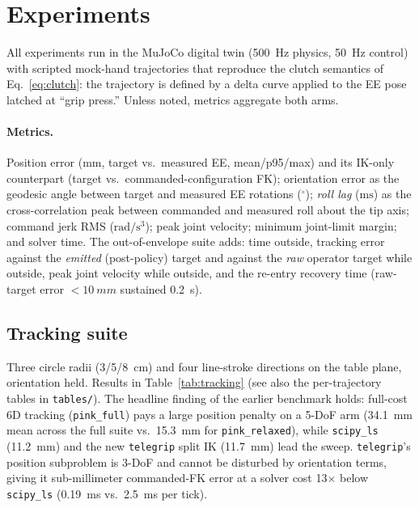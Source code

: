 \section{Experiments}
\label{sec:experiments}

All experiments run in the MuJoCo digital twin (\SI{500}{Hz} physics,
\SI{50}{Hz} control) with scripted mock-hand trajectories that reproduce the
clutch semantics of Eq.~\eqref{eq:clutch}: the trajectory is defined by a
delta curve applied to the EE pose latched at ``grip press.'' Unless noted,
metrics aggregate both arms.

\paragraph{Metrics.}
Position error (\(\mathrm{mm}\), target vs.\ measured EE, mean/p95/max) and
its IK-only counterpart (target vs.\ commanded-configuration FK);
orientation error as the geodesic angle between target and measured EE
rotations (\(^\circ\)); \emph{roll lag} (\(\mathrm{ms}\)) as the
cross-correlation peak between commanded and measured roll about the tip
axis; command jerk RMS (\(\mathrm{rad/s^3}\)); peak joint velocity; minimum
joint-limit margin; and solver time. The out-of-envelope suite adds:
time outside, tracking error against the \emph{emitted} (post-policy)
target and against the \emph{raw} operator target while outside, peak joint
velocity while outside, and the re-entry recovery time (raw-target error
\(<\SI{10}{mm}\) sustained \SI{0.2}{s}).

\subsection{Tracking suite}
\label{sec:exp-tracking}

Three circle radii (3/5/\SI{8}{cm}) and four line-stroke directions on the
table plane, orientation held. Results in
Table~\ref{tab:tracking} (see also the per-trajectory tables in
\texttt{tables/}). The headline finding of the earlier benchmark holds:
full-cost 6D tracking (\texttt{pink\_full}) pays a large position penalty
on a 5-DoF arm (\SI{34.1}{mm} mean across the full suite vs.\
\SI{15.3}{mm} for \texttt{pink\_relaxed}), while \texttt{scipy\_ls}
(\SI{11.2}{mm}) and the new \texttt{telegrip} split IK (\SI{11.7}{mm})
lead the sweep. \texttt{telegrip}'s position subproblem is 3-DoF and
cannot be disturbed by orientation terms, giving it sub-millimeter
commanded-FK error at a solver cost 13\(\times\) below
\texttt{scipy\_ls} (\SI{0.19}{ms} vs.\ \SI{2.5}{ms} per tick).

